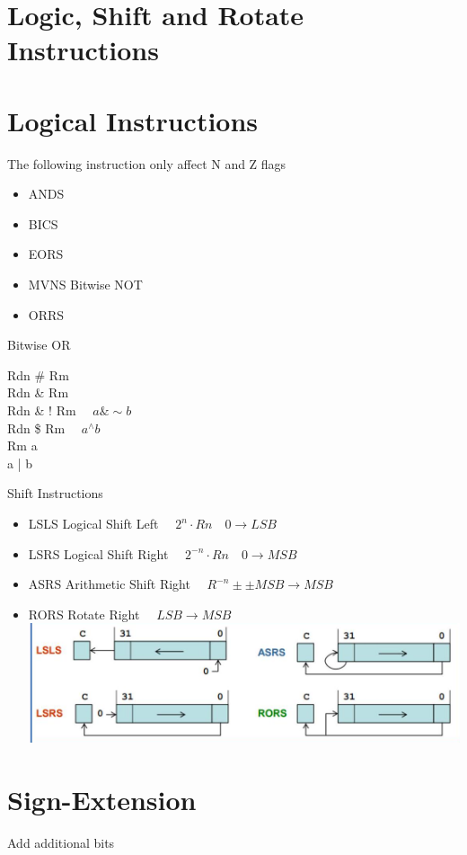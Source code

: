 \section{Logic, Shift and Rotate Instructions}

\section*{Logical Instructions}
The following instruction only affect N and Z flags

\begin{itemize}
  \item ANDS
  \item BICS
  \item EORS
  \item MVNS Bitwise NOT
  \item ORRS
\end{itemize}

Bitwise OR

Rdn \# Rm\\
Rdn \& Rm\\
Rdn \& ! Rm $\quad a \& \sim b$\\
Rdn \$ Rm $\quad a{ }^{\wedge} b$\\
Rm a\\
a | b

Shift Instructions

\begin{itemize}
  \item LSLS Logical Shift Left $\quad 2^{n} \cdot R n \quad 0 \rightarrow L S B$
  \item LSRS Logical Shift Right $\quad 2^{-n} \cdot R n \quad 0 \rightarrow M S B$
  \item ASRS Arithmetic Shift Right $\quad R^{-n} \pm \pm M S B \rightarrow M S B$
  \item RORS Rotate Right $\quad L S B \rightarrow M S B$\\
\includegraphics[width=\linewidth]{images/2024_12_29_79e6b22f503fb7b4f718g-06}
\end{itemize}

\section*{Sign-Extension}
Add additional bits

